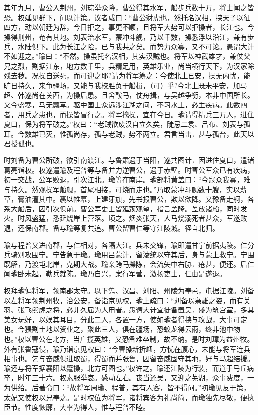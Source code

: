 \documentclass[12pt,UTF8]{ctexbook}
\begin{document}
其年九月，曹公入荆州，刘琮举众降，曹公得其水军，船步兵数十万，将士闻之皆恐。权延见群下，问以计策。议者咸曰：“曹公豺虎也，然托名汉相，挟天子以征四方，动以朝廷为辞，今日拒之，事更不顺，且将军大势可以拒操者，长江也。今操得荆州，奄有其地。刘表治水军，蒙冲斗舰，乃以千数，操悉浮以沿江，兼有步兵，水陆俱下。此为长江之险，已与我共之矣。而势力众寡，又不可论。愚谓大计不如迎之。”瑜曰：“不然。操虽托名汉相，其实汉贼也。将军以神武雄才，兼仗父兄之烈，割据江东，地方数千里，兵精足用，英雄乐业，尚当横行天下，为汉家除残去秽。况操自送死，而可迎之耶?请为将军筹之：今使北土已安，操无内忧，能旷日持久，来争疆场，又能与我校胜负于船楫，（可）乎?今北土既未平安，加马超、韩遂尚在关西，为操后患。且舍鞍马，仗舟揖，与吴越争衡，本非中国所长。又今盛寒，马无藁草。驱中国士众远涉江湖之间，不习水土，必生疾病。此数四者，用兵之患也，而操皆冒行之。将军擒操，宜在今日。瑜请得精兵三万人，进住夏口，保为将军破之。”权曰：“老贼欲废汉自立久矣，陡忌二袁、吕布、刘表与孤耳。今数雄已灭，惟孤尚存，孤与老贼，势不两立。君言当击，甚与孤台，此天以君授孤也。

时刘备为曹公所破，欲引南渡江。与鲁肃遇于当阳，遂共图计，因进住夏口，遣诸葛亮诣权。权遂遣瑜及程普等与备并力逆曹公，遇于赤壁。时曹公军众已有疾病，初一交战，公军败退，引次江北。瑜等在南岸。瑜部将黄盖曰：“今寇众我寡，难与持久。然观操军船舰，首尾相接，可烧而走也。”乃取蒙冲斗舰数十艘，实以薪草，膏油灌其中。裹以帷幕，上建牙旗，先书报曹公，欺以欲降。又豫备走舸，各系大船后，因引次俱前。曹公军吏士皆延颈观望，指言盖降。盖放诸船，同时发火。时风盛猛，悉延烧岸上营落。顷之。烟炎张天，人马烧溺死者甚众，军遂败退，还保南郡。备与瑜等复共追。曹公留曹仁等守江陵城。径自北归。

瑜与程普又进南郡，与仁相对，各隔大江。兵未交锋，瑜即遣甘宁前据夷陵。仁分兵骑别攻围宁。宁告急于瑜。瑜用吕蒙计，留淩统以守其后，身与蒙上救宁。宁围既解，乃渡屯北岸，克期大战。瑜亲跨马擽陈，会流矢中右胁，疮甚，便还。后仁闻瑜卧未起，勒兵就陈。瑜乃自兴，案行军营，激扬吏士，仁由是遂退。

权拜瑜偏将军，领南郡太守。以下隽、汉昌、刘阳、州陵为奉邑，屯据江陵。刘备以左将军领荆州牧，治公安，备诣京见权，瑜上疏曰：“刘备以枭雄之姿，而有关羽、张飞熊虎之将，必非久屈为人用者。愚谓大计宜徙备置吴，盛为筑宫室，多其美女玩好，以娱其耳目，分此二人，各置一方，使如瑜者得挟与攻战，大事可定也。今猥割土地以资业之，聚此三人，俱在疆场，恐蛟龙得云雨，终非池中物也。”权以曹公在北方，当广揽英雄，又恐备难卒制，故不纳。是时刘璋为益州牧。外有张鲁寇侵，瑜乃诣京见权曰：“今曹操新折衄，方忧在腹心，未能与将军连兵相事也。乞与奋威俱进取蜀，得蜀而并张鲁，因留奋威固守其地，好与马超结援。瑜还与将军据襄阳以蹙操，北方可图也。”权许之。瑜还江陵为行装，而道于马丘病卒，时年三十六。权素服举哀。感动左右。丧当还吴，又迎之芜湖，众事费度，一为供给。后著令曰：“故将军周瑜、程普，其有人客，皆不得问。”初瑜见友于策，太妃又使权以兄奉之。是时权位为将军，诸将宾客为礼尚简，而瑜独先尽敬，便执臣节。性度恢廓，大率为得人，惟与程普不睦。
\end{document}
